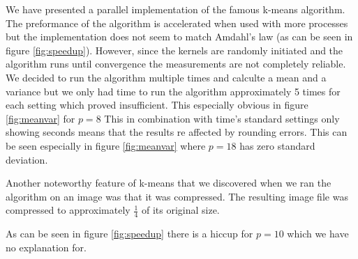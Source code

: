 
We have presented a parallel implementation of the famous k-means algorithm. The preformance of the algorithm is accelerated when used with more processes but the implementation does not seem to match Amdahl's law (as can be seen in figure \ref{fig:speedup}). However, since the kernels are randomly initiated and the algorithm runs until convergence the measurements are not completely reliable. We decided to run the algorithm multiple times and calculte a mean and a variance but we only had time to run the algorithm approximately 5 times for each setting which proved insufficient. This especially obvious in figure \ref{fig:meanvar} for $p=8$ This in combination with time's standard settings only showing seconds means that the results re affected by rounding errors. This can be seen especially in figure \ref{fig:meanvar} where $p=18$ has zero standard deviation.

Another noteworthy feature of k-means that we discovered when we ran the algorithm on an image was that it was compressed. The resulting image file was compressed to approximately $\frac{1}{4}$ of its original size.

As can be seen in figure \ref{fig:speedup} there is a hiccup for $p=10$ which we have no explanation for.
